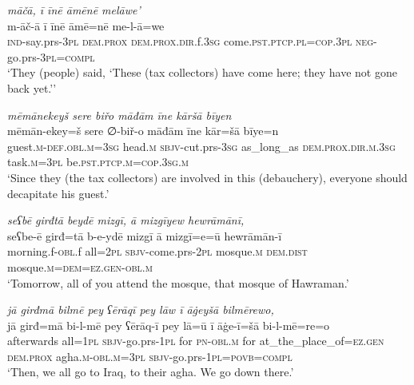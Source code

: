 \ea \label{BP.47}
\textit{māčā, ī īnē āmēnē melāwe’} \\ 
\gll m-āč-ā ī īnē āmē=nē me-l-ā=we \\ 
 \textsc{ind-}say.prs\textsc{-3pl} \textsc{dem.prox} \textsc{dem.prox}\textsc{.dir}.f\textsc{.3sg} come\textsc{.pst}\textsc{.ptcp}\textsc{.pl}\textsc{=cop}\textsc{.3pl} \textsc{neg-}go.prs\textsc{-3pl}\textsc{=compl} \\ 
\glt `They (people) said, ‘These (tax collectors) have come here; they have not gone back yet.’'
\z 
 
\ea \label{BP.53}
\textit{mēmānekeyš sere biřo māđām īne kāršā bīyen} \\ 
\gll mēmān-ekey=š sere ∅-biř-o māđām īne kār=šā bīye=n \\ 
 guest\textsc{.m}\textsc{-def}\textsc{.obl}\textsc{.m}\textsc{=3sg} head\textsc{.m} \textsc{sbjv-}cut.prs\textsc{-3sg} as\_long\_as \textsc{dem.prox}\textsc{.dir}\textsc{.m}\textsc{.3sg} task\textsc{.m}\textsc{=3pl} be\textsc{.pst}\textsc{.ptcp}\textsc{.m}\textsc{=cop}\textsc{.3sg}\textsc{.m} \\ 
\glt `Since they (the tax collectors) are involved in this (debauchery), everyone should decapitate his guest.'
\z 
 
\ea \label{BP.54}
\textit{seʕbē girđtā beydē mizgī, ā mizgīyew hewrāmānī,} \\ 
\gll seʕbe-ē girđ=tā b-e-ydē mizgī ā mizgī=e=ū hewrāmān-ī \\ 
 morning.f\textsc{-obl}.f all=\textsc{2pl} \textsc{sbjv-}come.prs-\textsc{2pl} mosque\textsc{.m} \textsc{dem.dist} mosque\textsc{.m}\textsc{=dem}\textsc{=ez.gen}\textsc{-obl}\textsc{.m} \\ 
\glt `Tomorrow, all of you attend the mosque, that mosque of Hawraman.'
\z 
 
\ea \label{BP.56}
\textit{jā girđmā bilmē pey ʕērāqī pey lāw ī āġeyšā bilmērewo,} \\ 
\gll jā girđ=mā bi-l-mē pey ʕērāq-ī pey lā=ū ī āġe-ī=šā bi-l-mē=re=o \\ 
 afterwards all\textsc{=\textsc{1pl}} \textsc{sbjv-}go.prs\textsc{-\textsc{1pl}} for \textsc{pn}\textsc{-obl}\textsc{.m} for at\_the\_place\_of\textsc{=ez.gen} \textsc{dem.prox} agha\textsc{.m}\textsc{-obl}\textsc{.m}\textsc{=3pl} \textsc{sbjv-}go.prs\textsc{-\textsc{1pl}}\textsc{=\textsc{povb}}\textsc{=compl} \\ 
\glt `Then, we all go to Iraq, to their agha. We go down there.'
\z 
 
